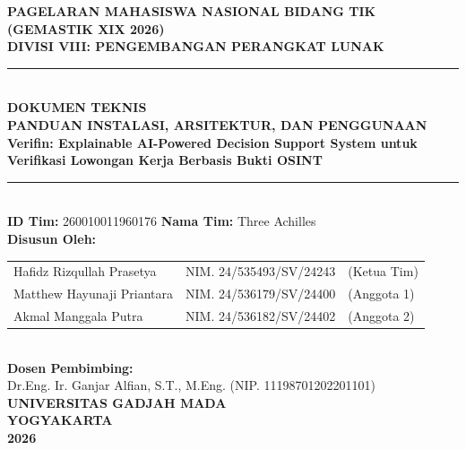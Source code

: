 \documentclass[12pt,a4paper]{article}
\begin{document}
\begin{titlepage}
    \thispagestyle{empty}
    \singlespacing
    \centering
    \vspace*{0.2cm}
    {\large \textbf{PAGELARAN MAHASISWA NASIONAL BIDANG TIK}}\\[0.2cm]
    {\normalsize \textbf{(GEMASTIK XIX 2026)}}\\[0.3cm]
    {\large \textbf{DIVISI VIII: PENGEMBANGAN PERANGKAT LUNAK}}\\[0.6cm]

    \rule{\textwidth}{1.2pt}\\[0.3cm]
    {\Large \textbf{DOKUMEN TEKNIS}}\\[0.15cm]
    {\normalsize \textbf{PANDUAN INSTALASI, ARSITEKTUR, DAN PENGGUNAAN}}\\[0.25cm]
    {\large \textbf{Verifin: Explainable AI-Powered Decision Support System untuk Verifikasi Lowongan Kerja Berbasis Bukti OSINT}}\\[0.3cm]
    \rule{\textwidth}{1.2pt}\\[0.6cm]

    \textbf{ID Tim:} 260010011960176 \quad\textbar\quad \textbf{Nama Tim:} Three Achilles\\[0.6cm]

    \textbf{Disusun Oleh:}\\[0.2cm]
    \small
    \begin{tabular}{lll}
        Hafidz Rizqullah Prasetya & NIM. 24/535493/SV/24243 & (Ketua Tim) \\
        Matthew Hayunaji Priantara & NIM. 24/536179/SV/24400 & (Anggota 1) \\
        Akmal Manggala Putra & NIM. 24/536182/SV/24402 & (Anggota 2) \\
    \end{tabular}\\[0.6cm]

    \normalsize
    \textbf{Dosen Pembimbing:}\\[0.15cm]
    Dr.Eng. Ir. Ganjar Alfian, S.T., M.Eng. (NIP. 11198701202201101)\\[0.8cm]

    \vfill
    {\large \textbf{UNIVERSITAS GADJAH MADA}}\\[0.1cm]
    {\normalsize \textbf{YOGYAKARTA}}\\[0.1cm]
    {\normalsize \textbf{2026}}
\end{titlepage}
\end{document}
